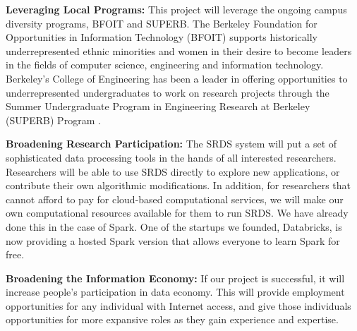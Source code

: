 {\bf Leveraging  Local Programs:} This project will leverage the ongoing campus diversity programs, BFOIT and SUPERB. The Berkeley Foundation for Opportunities in Information Technology (BFOIT) \cite{bfoit} supports historically underrepresented ethnic minorities and women in their desire to become leaders in the fields of computer science, engineering and information technology. 
Berkeley's College of Engineering has been a leader in offering opportunities to underrepresented undergraduates to work on research projects through the Summer Undergraduate Program in Engineering Research at Berkeley (SUPERB) Program \cite{superb}.  

{\bf Broadening Research Participation:} The SRDS system will put a set of sophisticated data processing tools in the hands of all interested researchers.  Researchers will be able to use SRDS directly to explore new applications, or contribute their own algorithmic modifications.  In addition, for researchers that cannot afford to pay for cloud-based computational services, we will make our own computational resources available for them to run SRDS. We have already done this in the case of Spark. One of the startups we founded, Databricks, is now providing a hosted Spark version that allows everyone to learn Spark for free.

{\bf Broadening the Information Economy:} If our project is successful, it will increase people's participation in data economy.  This will provide employment opportunities for any individual with Internet access, and give those individuals opportunities for more expansive roles as they gain experience and expertise.  


